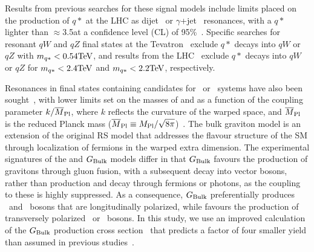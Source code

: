 





Results from previous searches for these signal models include limits
placed on the production of $q*$ at the LHC as
dijet~\cite{exo12016,ATLASexcitedPAS,Harris:2011bh} or
$\gamma$+jet~\cite{Aad:2013cva} resonances, with a $q*$ lighter
than $\approx$3.5\TeVcc at a confidence level (CL) of
95\%~\cite{exo12016}. Specific searches for resonant $qW$ and
$qZ$ final states at the
Tevatron~\cite{CDFexcitedPAPER,D0excitedPAPER} exclude $q*$ decays
into $qW$ or $qZ$ with $m_{q*}<0.54\mathrm{TeV}$, and results
from the LHC~\cite{ref_2011,CMSqZPAS} exclude $q*$ decays into
$qW$ or $qZ$ for $m_{q*}< 2.4\mathrm{TeV}$ and $m_{q*}<
2.2\mathrm{TeV}$, respectively.

Resonances in final states containing candidates for \PW\PW\ or
\cPZ\cPZ\ systems have also been
sought~\cite{CMSZZPAS2,ATLASWWPAPER,ATLASZZPAPER,CDFZZPAPER}, with
lower limits set on the masses of \GRS and \GBulk as a function of
the coupling parameter $k/\overline{M}_\text{Pl}$, where $k$ reflects the curvature of
the warped space, and $\overline{M}_\text{Pl}$ is the reduced Planck mass ($\overline{M}_\text{Pl} \equiv
M_\text{Pl}/\sqrt{8\pi}$)~\cite{rs1,Randall:1999vf}. The bulk graviton
model is an extension of the original RS model that addresses the
flavour structure of the SM through localization of fermions in the
warped extra dimension. The experimental signatures of the \GRS and
$G_\mathrm{Bulk}$ models differ in that $G_\mathrm{Bulk}$ favours the production of
gravitons through gluon fusion, with a subsequent decay into vector bosons,
rather than production and decay through fermions or photons, as the
coupling to these is highly suppressed. As a consequence, $G_\mathrm{Bulk}$
preferentially produces \PW\ and \cPZ\ bosons that are longitudinally polarized,
while \GRS favours the production of transversely polarized
\PW\ or \cPZ\ bosons. In this study, we use an improved calculation of
the $G_\mathrm{Bulk}$ production cross section~\cite{GravitonWWZZ1} that predicts a factor of four smaller yield than
assumed in previous studies~\cite{CMSZZPAS2,ATLASWWPAPER}.

